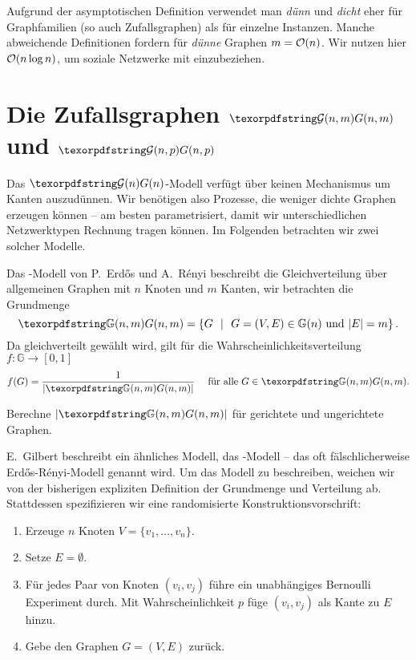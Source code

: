 \begin{remark}
    Aufgrund der asymptotischen Definition verwendet man \emph{dünn} und \emph{dicht} eher für Graphfamilien (so auch Zufallsgraphen) als für einzelne Instanzen.
    Manche abweichende Definitionen fordern für \emph{dünne} Graphen $m = \mathcal{O}\!\left(n\right)$.
    Wir nutzen hier $\mathcal{O}\!\left(n\log n\right)$, um soziale Netzwerke mit einzubeziehen.
\end{remark}

\section{Die Zufallsgraphen $\Gnm$ und $\Gnp$}
Das $\Gn$-Modell verfügt über keinen Mechanismus um Kanten auszudünnen.
Wir benötigen also Prozesse, die weniger dichte Graphen erzeugen können --
am besten parametrisiert, damit wir unterschiedlichen Netzwerktypen Rechnung tragen können.
Im Folgenden betrachten wir zwei solcher Modelle.

Das \Gnm-Modell  von P.~Erd\H{o}s und A.~R\'enyi beschreibt die Gleichverteilung über allgemeinen Graphen mit $n$ Knoten und $m$ Kanten, \dh wir betrachten die Grundmenge
\begin{equation}
    \gGnm = \twoset{G}{G=(V,E) \in \mathbb G(n) \textnormal{ und } |E| = m}.
\end{equation}
Da gleichverteilt gewählt wird, gilt für die Wahrscheinlichkeitsverteilung~{$f\colon \mathbb G \to [0,1]$}
\begin{equation}
    f(G) = \frac{1}{| \gGnm |} \quad \text{ für alle } G \in \gGnm.
\end{equation}

\begin{exercise}
    Berechne $|\gGnm|$ für gerichtete und ungerichtete Graphen.
\end{exercise}

E.~Gilbert  beschreibt ein ähnliches Modell, das \Gnp-Modell -- das oft fälschlicherweise \glqq Erd\H{o}s-R\'enyi-Modell \grqq{} genannt wird.
Um das Modell zu beschreiben, weichen wir von der bisherigen expliziten Definition der Grundmenge und Verteilung ab.
Stattdessen spezifizieren wir eine randomisierte Konstruktionsvorschrift:
\begin{enumerate}
    \item Erzeuge $n$ Knoten $V = \{v_1, \ldots, v_n\}$.
    \item Setze $E = \emptyset$.
    \item Für jedes Paar von Knoten $(v_i, v_j)$ führe ein unabhängiges Bernoulli Experiment durch.
          Mit Wahrscheinlichkeit $p$ füge $(v_i, v_j)$ als Kante zu $E$ hinzu.
    \item Gebe den Graphen $G=(V, E)$ zurück.
\end{enumerate}

